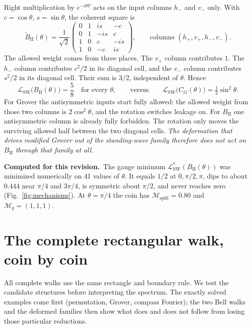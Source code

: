 \documentclass[11pt,a4paper,oneside]{report}
\newcommand{\sw}{\mathrm{SW}}
\newcommand{\session}{\textbf{Computed for this revision.}\ }
\numberwithin{equation}{chapter}
\begin{document}
Right multiplication by \(e^{-i\theta V}\) acts on the input columns
\(h_-\) and \(v_-\) only. With \(c=\cos\theta\), \(s=\sin\theta\), the
coherent square is
\begin{equation}
\widetilde B_{\mathrm{II}}(\theta)=\frac1{\sqrt2}
\begin{pmatrix}
0&1&is&-c\\
0&1&-is&c\\
1&0&c&-is\\
1&0&-c&is
\end{pmatrix},
\qquad\text{columns }(h_+,v_+,h_-,v_-).
\end{equation}
The allowed weight comes from three places. The \(v_+\) column
contributes \(1\). The \(h_-\) column contributes \(c^2/2\) in its
diagonal cell, and the \(v_-\) column contributes \(s^2/2\) in its
diagonal cell. Their sum is \(3/2\), independent of \(\theta\). Hence
\begin{equation}
\boxed{\mathcal L_{\sw}\big(B_{\mathrm{II}}(\theta)\big)=\frac58\quad
\text{for every }\theta,}
\qquad\text{versus}\qquad
\mathcal L_{\sw}\big(C_G(\theta)\big)=\tfrac12\sin^2\theta.
\end{equation}
For Grover the antisymmetric inputs start fully allowed: the allowed
weight from those two columns is \(2\cos^2\theta\), and the rotation
switches leakage on. For \(B_{\mathrm{II}}\) one antisymmetric column is
already fully forbidden. The rotation only moves the surviving allowed
half between the two diagonal cells. \emph{The deformation that drives
modified Grover out of the standing-wave family therefore does not act on
\(B_{\mathrm{II}}\) through that family at all.}

\session The gauge minimum
\(\mathcal L^*_{\sw}(B_{\mathrm{II}}(\theta))\) was minimized numerically
on 41 values of \(\theta\). It equals \(1/2\) at \(0,\pi/2,\pi\), dips to
about \(0.444\) near \(\pi/4\) and \(3\pi/4\), is symmetric about
\(\pi/2\), and never reaches zero (Fig.~\ref{fig:mechanisms}). At
\(\theta=\pi/4\) the coin has \(\mathcal M_{\mathrm{split}}=0.80\) and
\(\mathcal M_q=(1,1,1)\).

\chapter{The complete rectangular walk, coin by coin}
\label{ch:assembled}

All complete walks use the same rectangle and boundary rule. We test the
candidate structures before interpreting the spectrum. The exactly solved
examples come first (permutation, Grover, compass Fourier); the two Bell
walks and the deformed families then show what does and does not follow
from losing those particular reductions.
\end{document}

